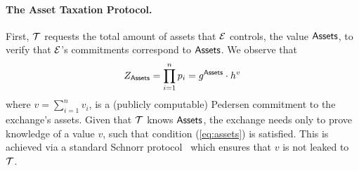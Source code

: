\paragraph{The Asset Taxation Protocol.}\label{subsec:tax-authority-proto}

First, $\mathcal{T}$ requests the total amount of assets that $\mathcal{E}$
controls, \ie the value $\mathsf{Assets}$, to verify that $\mathcal{E}$'s
commitments correspond to $\mathsf{Assets}$. We observe that
\begin{align}
    Z_{\mathsf{Assets}} = \prod_{i = 1}^n p_i = g^{\mathsf{Assets}} \cdot h^v \label{eq:assets}
\end{align}
where $v = {\sum_{i = 1}^n v_i}$, is a (publicly computable) Pedersen
commitment to the exchange's assets. Given that $\mathcal{T}$ knows $\mathsf{Assets}$, the
exchange needs only to prove knowledge of a value $v$, such that condition
(\ref{eq:assets}) is satisfied. This is achieved via a standard Schnorr
protocol~\cite{C:Schnorr89} which ensures that $v$ is not leaked to $\mathcal{T}$.

